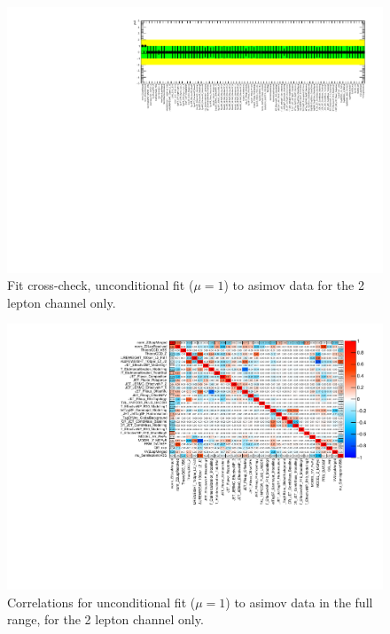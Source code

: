 \begin{figure}[ht]
      \centering
        \includegraphics[width=\linewidth]{figures/2lep/FitResults/NP_allExceptGammas_AsimovAllbins.pdf}
        \caption{Fit cross-check, unconditional fit ($\mu=1$) to asimov data for the 2 lepton channel only.}
       \label{fig:fit_2lep_fcc_asimov}
\end{figure}

\begin{figure}[ht]
      \centering
        \includegraphics[width=\linewidth]{figures/2lep/FitResults/corr_HighCorrNoMCStat_AsimovAllbins.pdf}
        \caption{Correlations for unconditional fit ($\mu=1$) to asimov data in the full range, for the 2 lepton channel only.}
       \label{fig:fit_2lep_corr_all}
\end{figure}

